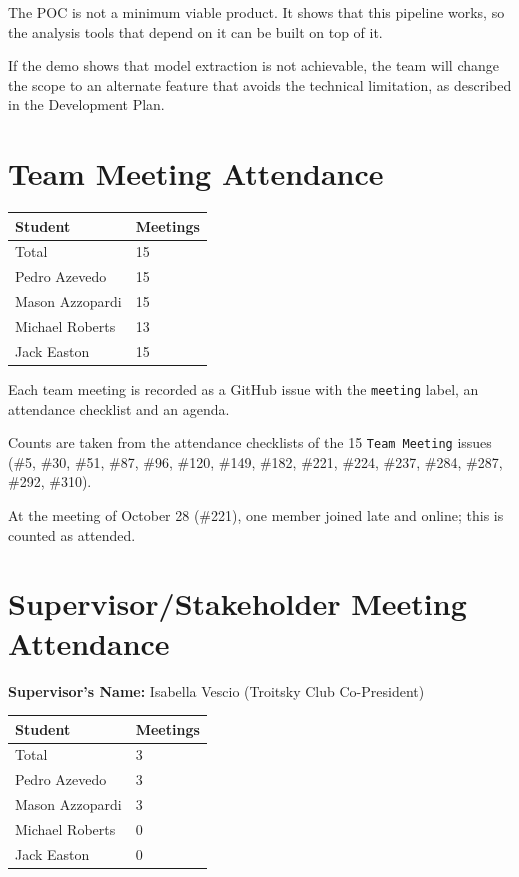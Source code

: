 \documentclass{article}
\begin{document}
The POC is not a minimum viable product. It shows that this pipeline works, so
the analysis tools that depend on it can be built on top of it.

If the demo shows that model extraction is not achievable, the team will change
the scope to an alternate feature that avoids the technical limitation, as
described in the Development Plan.

\section{Team Meeting Attendance}

\begin{table}[H]
\centering
\begin{tabular}{ll}
\toprule
\textbf{Student} & \textbf{Meetings}\\
\midrule
Total & 15\\
Pedro Azevedo & 15\\
Mason Azzopardi & 15\\
Michael Roberts & 13\\
Jack Easton & 15\\
\bottomrule
\end{tabular}
\end{table}

Each team meeting is recorded as a GitHub issue with the \texttt{meeting}
label, an attendance checklist and an agenda.

Counts are taken from the attendance checklists of the 15 \texttt{Team Meeting}
issues (\#5, \#30, \#51, \#87, \#96, \#120, \#149, \#182, \#221, \#224, \#237, \#284,
\#287, \#292, \#310).

At the meeting of October 28 (\#221), one member joined late and online; this
is counted as attended.

\section{Supervisor/Stakeholder Meeting Attendance}

\noindent \textbf{Supervisor's Name: } Isabella Vescio (Troitsky Club
Co-President)

\begin{table}[H]
\centering
\begin{tabular}{ll}
\toprule
\textbf{Student} & \textbf{Meetings}\\
\midrule
Total & 3\\
Pedro Azevedo & 3\\
Mason Azzopardi & 3\\
Michael Roberts & 0\\
Jack Easton & 0\\
\bottomrule
\end{tabular}
\end{table}
\end{document}
